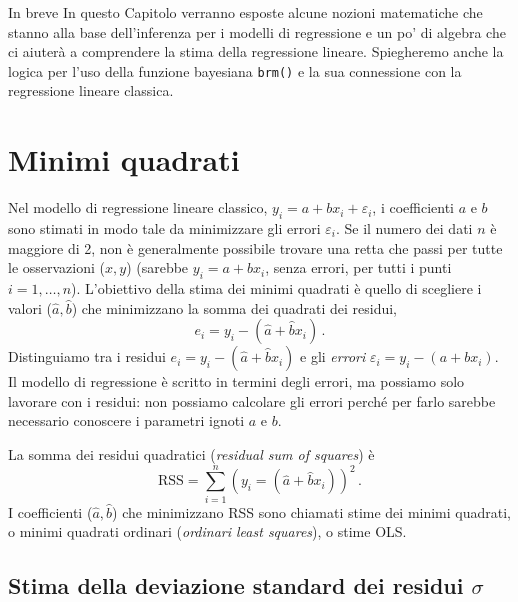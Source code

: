 \documentclass[
  10pt,
  italian,
  a4paper,
  extrafontsizes,onecolumn,openright
  ]{memoir}
\newenvironment{Summary}
  {\begin{bclogo}[logo=\bctrombone, noborder=true, couleur=lightgray!50]{In breve}\parindent0pt}
  {\end{bclogo}}
\begin{document}
\begin{Summary}
In questo Capitolo verranno esposte alcune nozioni matematiche che
stanno alla base dell'inferenza per i modelli di regressione e un po' di
algebra che ci aiuterà a comprendere la stima della regressione lineare.
Spiegheremo anche la logica per l'uso della funzione bayesiana
\texttt{brm()} e la sua connessione con la regressione lineare classica.
\end{Summary}

\hypertarget{minimi-quadrati}{%
\section{Minimi quadrati}\label{minimi-quadrati}}

Nel modello di regressione lineare classico, \(y_i = a + b x_i + \varepsilon_i\), i coefficienti \(a\) e \(b\) sono stimati in modo tale da minimizzare gli errori \(\varepsilon_i\). Se il numero dei dati \(n\) è maggiore di 2, non è generalmente possibile trovare una retta che passi per tutte le osservazioni (\(x, y\)) (sarebbe \(y_i = a + b x_i\), senza errori, per tutti i punti \(i = 1, \dots, n\)). L'obiettivo della stima dei minimi quadrati è quello di scegliere i valori (\(\hat{a}, \hat{b}\)) che minimizzano la somma dei quadrati dei residui,
\begin{equation}
e_i = y_i − (\hat{a} + \hat{b} x_i)\,.
\end{equation}
Distinguiamo tra i residui \(e_i = y_i - (\hat{a} + \hat{b} x_i)\) e gli \emph{errori} \(\varepsilon_i = y_i − (a + b x_i)\). Il modello di regressione è scritto in termini degli errori, ma possiamo solo lavorare con i residui: non possiamo calcolare gli errori perché per farlo sarebbe necessario conoscere i parametri ignoti \(a\) e \(b\).

La somma dei residui quadratici (\emph{residual sum of squares}) è
\begin{equation}
\text{RSS} = \sum_{i=1}^n (y_i = (\hat{a} + \hat{b} x_i))^2\,.
\end{equation}
I coefficienti (\(\hat{a}, \hat{b}\)) che minimizzano RSS sono chiamati stime dei minimi quadrati, o minimi quadrati ordinari (\emph{ordinari least squares}), o stime OLS.

\hypertarget{stima-della-deviazione-standard-dei-residui-sigma}{%
\subsection{\texorpdfstring{Stima della deviazione standard dei residui \(\sigma\)}{Stima della deviazione standard dei residui \textbackslash sigma}}\label{stima-della-deviazione-standard-dei-residui-sigma}}
\end{document}
